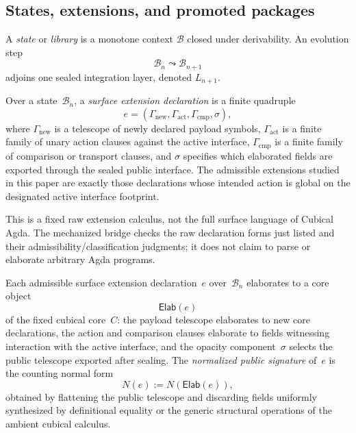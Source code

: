 \documentclass{lmcs}
\newcommand{\B}{\mathcal{B}}
\begin{document}
\subsection{States, extensions, and promoted packages}

\begin{defi}[State]
\label{def:state}
A \emph{state} or \emph{library} is a monotone context $\B$ closed under derivability. An evolution step
\[
  \B_n \leadsto \B_{n+1}
\]
adjoins one sealed integration layer, denoted $L_{n+1}$.
\end{defi}

\begin{defi}
\label{def:surface-extension}
Over a state~$\B_n$, a \emph{surface extension declaration} is a finite quadruple
\[
  e = (\Gamma_{\mathrm{new}}, \Gamma_{\mathrm{act}}, \Gamma_{\mathrm{cmp}}, \sigma),
\]
where $\Gamma_{\mathrm{new}}$ is a telescope of newly declared payload symbols, $\Gamma_{\mathrm{act}}$ is a finite family of unary action clauses against the active interface, $\Gamma_{\mathrm{cmp}}$ is a finite family of comparison or transport clauses, and $\sigma$ specifies which elaborated fields are exported through the sealed public interface. The admissible extensions studied in this paper are exactly those declarations whose intended action is global on the designated active interface footprint.
\end{defi}

This is a fixed raw extension calculus, not the full surface language of Cubical Agda. The mechanized bridge checks the raw declaration forms just listed and their admissibility/classification judgments; it does not claim to parse or elaborate arbitrary Agda programs.

\begin{defi}
\label{def:elaboration}
Each admissible surface extension declaration~$e$ over~$\B_n$ elaborates to a core object
\[
  \mathsf{Elab}(e)
\]
of the fixed cubical core~$C$: the payload telescope elaborates to new core declarations, the action and comparison clauses elaborate to fields witnessing interaction with the active interface, and the opacity component~$\sigma$ selects the public telescope exported after sealing. The \emph{normalized public signature} of~$e$ is the counting normal form
\[
  N(e) := N(\mathsf{Elab}(e)),
\]
obtained by flattening the public telescope and discarding fields uniformly synthesized by definitional equality or the generic structural operations of the ambient cubical calculus.
\end{defi}
\end{document}
